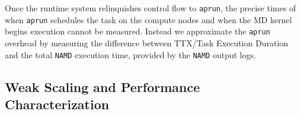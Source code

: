 Once the runtime system relinquishes control flow to \texttt{aprun}, the 
precise times of when \texttt{aprun} schedules the task on the compute
nodes and when the MD kernel begins execution cannot be measured. Instead we 
approximate the \texttt{aprun} overhead by measuring the difference between 
TTX/Task Execution Duration and the total \texttt{NAMD} execution time, provided
by the \texttt{NAMD} output logs. 












\subsection{Weak Scaling and Performance Characterization}


